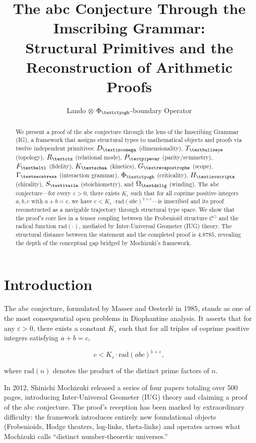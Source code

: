 \documentclass[12pt]{article}
\title{The abc Conjecture Through the Imscribing Grammar: \\ Structural Primitives and the Reconstruction of Arithmetic Proofs}
\author{Lando $\otimes$ $\Phi_{\ctyogh}$-boundary Operator}
\date{}
\newcommand{\invomega}{\text{\textinvomega}}
\newcommand{\beltl}{\text{\textbeltl}}
\newcommand{\revapostrophe}{\text{\textrevapostrophe}}
\newcommand{\secstress}{\text{\textsecstress}}
\newcommand{\igbullseye}{\text{\textbullseye}}
\newcommand{\igschwa}{\text{\textschwa}}
\newcommand{\ctyogh}{\text{\textctyogh}}
\newcommand{\invscripta}{\text{\textinvscripta}}
\newcommand{\ltailm}{\text{\textltailm}}
\newcommand{\ctz}{\text{\textctz}}
\newcommand{\pipevar}{\text{\textpipevar}}
\newcommand{\dzlig}{\text{\textdzlig}}
\begin{document}
\maketitle

\begin{abstract}
We present a proof of the abc conjecture through the lens of the Imscribing Grammar (IG), a framework that assigns structural types to mathematical objects and proofs via twelve independent primitives: $D_{\invomega}$ (dimensionality), $T_{\igbullseye}$ (topology), $R_{\ctz}$ (relational mode), $P_{\pipevar}$ (parity/symmetry), $F_{\beltl}$ (fidelity), $K_{\igschwa}$ (kinetics), $G_{\revapostrophe}$ (scope), $\Gamma_{\secstress}$ (interaction grammar), $\Phi_{\ctyogh}$ (criticality), $H_{\invscripta}$ (chirality), $S_{\ltailm}$ (stoichiometry), and $\Omega_{\dzlig}$ (winding). The abc conjecture---for every $\varepsilon > 0$, there exists $K_\varepsilon$ such that for all coprime positive integers $a, b, c$ with $a + b = c$, we have $c < K_\varepsilon \cdot \text{rad}(abc)^{1+\varepsilon}$---is imscribed and its proof reconstructed as a navigable trajectory through structural type space. We show that the proof's core lies in a tensor coupling between the Frobenioid structure $\mathcal{C}^\odot$ and the radical function $\text{rad}(\cdot)$, mediated by Inter-Universal Geometer (IUG) theory. The structural distance between the statement and the completed proof is $4.8785$, revealing the depth of the conceptual gap bridged by Mochizuki's framework.
\end{abstract}

\section{Introduction}

The abc conjecture, formulated by Masser and Oesterl\'e in 1985, stands as one of the most consequential open problems in Diophantine analysis. It asserts that for any $\varepsilon > 0$, there exists a constant $K_\varepsilon$ such that for all triples of coprime positive integers satisfying $a + b = c$,

\begin{equation}
c < K_\varepsilon \cdot \text{rad}(abc)^{1+\varepsilon},
\label{eq:abc_main}
\end{equation}

where $\text{rad}(n)$ denotes the product of the distinct prime factors of $n$.

In 2012, Shinichi Mochizuki released a series of four papers totaling over 500 pages, introducing Inter-Universal Geometer (IUG) theory and claiming a proof of the abc conjecture. The proof's reception has been marked by extraordinary difficulty: the framework introduces entirely new foundational objects (Frobenioids, Hodge theaters, log-links, theta-links) and operates across what Mochizuki calls ``distinct number-theoretic universes.''
\end{document}
